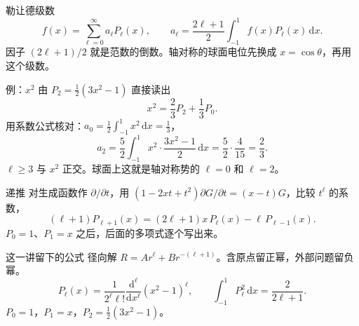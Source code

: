 \documentclass[fontset=windows, chinese, 10pt, xcolor=dvipsnames]{beamer}
\begin{document}
\begin{frame}{勒让德级数}
  \begin{equation*}
    f(x)=\sum_{\ell=0}^{\infty}a_{\ell}P_{\ell}(x),
    \qquad
    a_{\ell}=\frac{2\ell+1}{2}\int_{-1}^{1}f(x)P_{\ell}(x)\,\mathrm{d}x.
  \end{equation*}
  因子 $(2\ell+1)/2$ 就是范数的倒数。轴对称的球面电位先换成 $x=\cos\theta$，再用这个级数。
\end{frame}

\begin{frame}{例：$x^2$}
  由 $P_2=\frac12(3x^2-1)$ 直接读出
  \[
    x^2=\frac23 P_2+\frac13 P_0.
  \]
  用系数公式核对：$a_0=\frac12\int_{-1}^{1}x^2\,\mathrm{d}x=\frac13$，
  \[
    a_2=\frac52\int_{-1}^{1}x^2\cdot\frac{3x^2-1}{2}\,\mathrm{d}x
    =\frac52\cdot\frac{4}{15}=\frac23.
  \]
  $\ell\geq 3$ 与 $x^2$ 正交。球面上这就是轴对称势的 $\ell=0$ 和 $\ell=2$。
\end{frame}

\begin{frame}{递推}
  对生成函数作 $\partial/\partial t$，用 $(1-2xt+t^2)\partial G/\partial t=(x-t)G$，比较 $t^{\ell}$ 的系数，
  \begin{equation*}
    (\ell+1)P_{\ell+1}(x)
    =(2\ell+1)x\,P_{\ell}(x)-\ell\,P_{\ell-1}(x).
  \end{equation*}
  $P_0=1$、$P_1=x$ 之后，后面的多项式逐个写出来。
\end{frame}

\begin{frame}{这一讲留下的公式}
  径向解 $R=A r^{\ell}+B r^{-(\ell+1)}$。含原点留正幂，外部问题留负幂。
  \vspace{0.35em}
  \[
    P_{\ell}(x)
    =\frac{1}{2^{\ell}\ell!}\frac{\mathrm{d}^{\ell}}{\mathrm{d}x^{\ell}}(x^2-1)^{\ell},
    \qquad
    \int_{-1}^{1}P_{\ell}^2\,\mathrm{d}x=\frac{2}{2\ell+1}.
  \]
  $P_0=1$，$P_1=x$，$P_2=\frac12(3x^2-1)$。
\end{frame}
\end{document}
